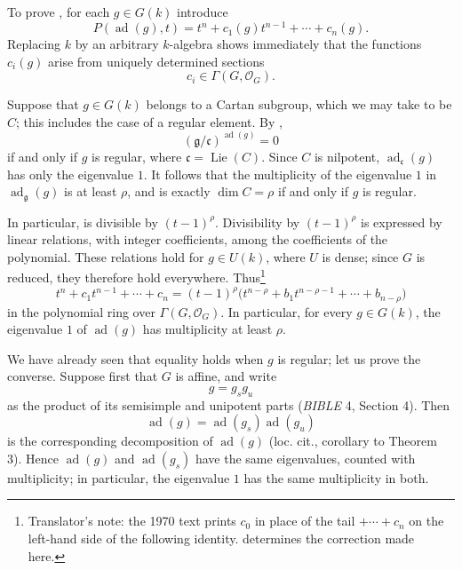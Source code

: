 To prove , for each \(g\in G(k)\) introduce 
\[
  P(\operatorname{ad}(g),t)
  =t^n+c_1(g)t^{n-1}+\cdots+c_n(g).
\]
Replacing \(k\) by an arbitrary \(k\)-algebra shows immediately that
the functions \(c_i(g)\) arise from uniquely determined sections
\[
  c_i\in\Gamma(G,\mathcal O_G).
\]

Suppose that \(g\in G(k)\) belongs to a Cartan subgroup, which we may
take to be \(C\); this includes the case of a regular element. By
,
\[
  (\mathfrak g/\mathfrak c)^{\operatorname{ad}(g)}=0
\]
if and only if \(g\) is regular, where
\(\mathfrak c=\operatorname{Lie}(C)\). Since \(C\) is nilpotent,
\(\operatorname{ad}_{\mathfrak c}(g)\) has only the eigenvalue \(1\).
It follows that the multiplicity of the eigenvalue \(1\) in
\(\operatorname{ad}_{\mathfrak g}(g)\) is at least \(\rho\), and is
exactly \(\dim C=\rho\) if and only if \(g\) is regular.

In particular,  is divisible by
\((t-1)^\rho\). Divisibility by \((t-1)^\rho\) is expressed by
linear relations, with integer coefficients, among the coefficients
of the polynomial. These relations hold for \(g\in U(k)\), where
\(U\) is dense; since \(G\) is reduced, they therefore hold
everywhere. Thus\footnote{Translator's note: the 1970 text prints
\(c_0\) in place of the tail \(+\cdots+c_n\) on the left-hand side of the
following identity.  determines the correction made here.}
\[
  t^n+c_1t^{n-1}+\cdots+c_n
  =(t-1)^\rho
    \bigl(t^{n-\rho}+b_1t^{n-\rho-1}+\cdots+b_{n-\rho}\bigr)
\]
in the polynomial ring over \(\Gamma(G,\mathcal O_G)\). In
particular, for every \(g\in G(k)\), the eigenvalue \(1\) of
\(\operatorname{ad}(g)\) has multiplicity at least \(\rho\).

We have already seen that equality holds when \(g\) is regular; let
us prove the converse. Suppose first that \(G\) is affine, and write
\[
  g=g_sg_u
\]
as the product of its semisimple and unipotent parts
(\emph{BIBLE} 4, Section 4). Then
\[
  \operatorname{ad}(g)
  =\operatorname{ad}(g_s)\operatorname{ad}(g_u)
\]
is the corresponding decomposition of \(\operatorname{ad}(g)\)
(loc. cit., corollary to Theorem 3). Hence
\(\operatorname{ad}(g)\) and \(\operatorname{ad}(g_s)\) have the same
eigenvalues, counted with multiplicity; in particular, the
eigenvalue \(1\) has the same multiplicity in both.

